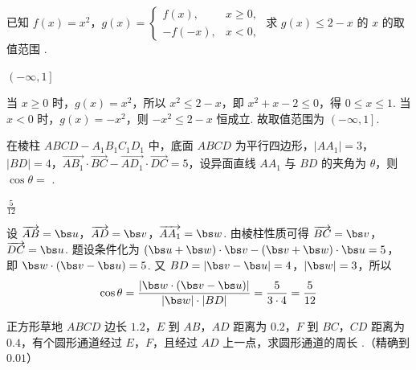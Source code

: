 \begin{problem}
已知 \(f(x)=x^2\)，\(g(x)=\displaystyle\begin{cases}
f(x), & x\ge 0,\\
-f(-x), & x<0,
\end{cases}\) 求 \(g(x)\le 2-x\) 的 \(x\) 的取值范围\fillinblank{} .
\end{problem}

\begin{answer}
\(\left(-\infty,1\right]\)
\end{answer}

\begin{solution}
当 \(x\ge 0\) 时，\(g(x)=x^2\)，所以 \(x^2\le 2-x\)，即 \(x^2+x-2\le 0\)，得 \(0\le x\le 1\). 当 \(x<0\) 时，\(g(x)=-x^2\)，则 \(-x^2\le 2-x\) 恒成立. 故取值范围为 \(\left(-\infty,1\right]\).
\end{solution}

\begin{problem}
在棱柱 \(ABCD-A_1B_1C_1D_1\) 中，底面 \(ABCD\) 为平行四边形，\(\left|AA_1\right|=3\)，\(\left|BD\right|=4\)，\(\overrightarrow{AB_1}\cdot\overrightarrow{BC}-\overrightarrow{AD_1}\cdot\overrightarrow{DC}=5\)，设异面直线 \(AA_1\) 与 \(BD\) 的夹角为 \(\theta\)，则 \(\cos\theta=\)\fillinblank{} .
\end{problem}

\begin{answer}
\(\frac{5}{12}\)
\end{answer}

\begin{solution}
设 \(\overrightarrow{AB}=\bs u\)，\(\overrightarrow{AD}=\bs v\)，\(\overrightarrow{AA_1}=\bs w\). 由棱柱性质可得 \(\overrightarrow{BC}=\bs v\)，\(\overrightarrow{DC}=\bs u\). 题设条件化为
\((\bs u+\bs w)\cdot \bs v-(\bs v+\bs w)\cdot \bs u=5\)，
即
\(\bs w\cdot(\bs v-\bs u)=5\).
又 \(BD=\left|\bs v-\bs u\right|=4\)，\(\left|\bs w\right|=3\)，所以
\[
\cos\theta=\frac{\left|\bs w\cdot(\bs v-\bs u)\right|}{\left|\bs w\right|\cdot\left|BD\right|}=\frac{5}{3\cdot 4}=\frac{5}{12}
\]
\end{solution}

\begin{problem}
正方形草地 \(ABCD\) 边长 \(1.2\)，\(E\) 到 \(AB\)，\(AD\) 距离为 \(0.2\)，\(F\) 到 \(BC\)，\(CD\) 距离为 \(0.4\)，有个圆形通道经过 \(E\)，\(F\)，且经过 \(AD\) 上一点，求圆形通道的周长\fillinblank{} .（精确到 \(0.01\)）

\end{problem}

